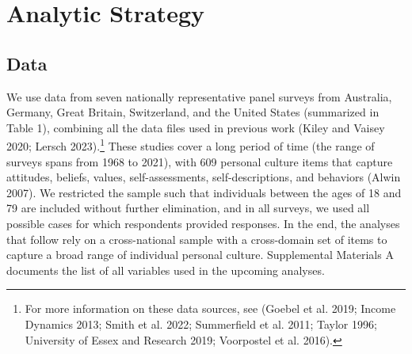 \documentclass[
  12pt,
]{article}
\begin{document}
\hypertarget{analytic-strategy}{%
\section{Analytic Strategy}\label{analytic-strategy}}

\hypertarget{data}{%
\subsection{Data}\label{data}}

We use data from seven nationally representative panel surveys from
Australia, Germany, Great Britain, Switzerland, and the United States
(summarized in Table 1), combining all the data files used in previous
work (Kiley and Vaisey 2020; Lersch 2023).\footnote{For more information
  on these data sources, see (Goebel et al. 2019; Income Dynamics 2013;
  Smith et al. 2022; Summerfield et al. 2011; Taylor 1996; University of
  Essex and Research 2019; Voorpostel et al. 2016).} These studies cover
a long period of time (the range of surveys spans from 1968 to 2021),
with 609 personal culture items that capture attitudes, beliefs, values,
self-assessments, self-descriptions, and behaviors (Alwin 2007). We
restricted the sample such that individuals between the ages of 18 and
79 are included without further elimination, and in all surveys, we used
all possible cases for which respondents provided responses. In the end,
the analyses that follow rely on a cross-national sample with a
cross-domain set of items to capture a broad range of individual
personal culture. Supplemental Materials A documents the list of all
variables used in the upcoming analyses.

\begin{table}[H]

\caption{\label{tab:unnamed-chunk-1}The Description of the Data Sources}
\centering
{}
\end{table}
\end{document}
